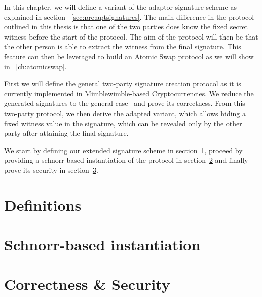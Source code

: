 In this chapter, we will define a variant of the adaptor signature scheme as explained in section ~\ref{sec:pre:aptsignatures}.
The main difference in the protocol outlined in this thesis is that one of the two parties does know the fixed secret witness before the start of the protocol.
The aim of the protocol will then be that the other person is able to extract the witness from the final signature.
This feature can then be leveraged to build an Atomic Swap protocol as we will show in ~\ref{ch:atomicswap}.


First we will define the general two-party signature creation protocol as it is currently implemented in Mimblewimble-based Cryptocurrencies.
We reduce the generated signatures to the general case~\cite{schnorr1989efficient} and prove its correctness.
From this two-party protocol, we then derive the adapted variant, which allows hiding a fixed witness value in the signature, which can be revealed only by the other party after attaining the final signature.


We start by defining our extended signature scheme in section~\ref{sec:sig:definitions}, proceed by providing a schnorr-based instantiation of the protocol in section~\ref{sec:sig:schnorr-inst} and finally prove its security in section~\ref{sec:sig:two-party-apt-security}.


\section{Definitions} \label{sec:sig:definitions}


\section{Schnorr-based instantiation} \label{sec:sig:schnorr-inst}


\section{Correctness \& Security}\label{sec:sig:two-party-apt-security}

